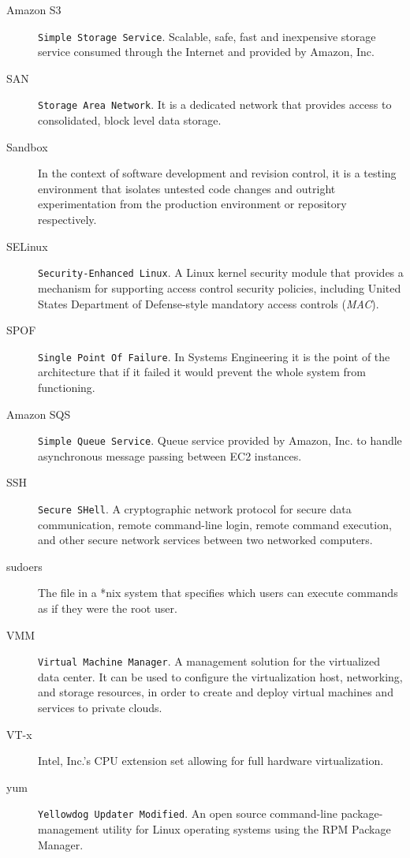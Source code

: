 \begin{description}
\item[Amazon S3] \texttt{Simple Storage Service}. Scalable, safe, fast and inexpensive storage service consumed through the Internet and provided by Amazon, Inc.
\item[SAN] \texttt{Storage Area Network}. It is a dedicated network that provides access to consolidated, block level data storage.
\item[Sandbox] In the context of software development and revision control, it is a testing environment that isolates untested code changes and outright experimentation from the production environment or repository respectively.
\item[SELinux] \texttt{Security-Enhanced Linux}. A Linux kernel security module that provides a mechanism for supporting access control security policies, including United States Department of Defense-style mandatory access controls (\emph{MAC}).
\item[SPOF] \texttt{Single Point Of Failure}. In Systems Engineering it is the point of the architecture that if it failed it would prevent the whole system from functioning.
\item[Amazon SQS] \texttt{Simple Queue Service}. Queue service provided by Amazon, Inc. to handle asynchronous message passing between EC2 instances.
\item[SSH] \texttt{Secure SHell}. A cryptographic network protocol for secure data communication, remote command-line login, remote command execution, and other secure network services between two networked computers.
\item[sudoers] The file in a *nix system that specifies which users can execute commands as if they were the root user.
\item[VMM] \texttt{Virtual Machine Manager}. A management solution for the virtualized data center. It can be used to configure the virtualization host, networking, and storage resources, in order to create and deploy virtual machines and services to private clouds.
\item[VT-x] Intel, Inc.'s CPU extension set allowing for full hardware virtualization.
\item[yum] \texttt{Yellowdog Updater Modified}. An open source command-line package-management utility for Linux operating systems using the RPM Package Manager.
\end{description}
